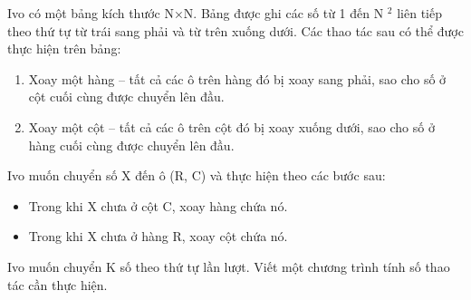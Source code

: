 Ivo có một bảng kích thước N×N. Bảng được ghi các số từ 1 đến N $^ 2 $ liên tiếp theo thứ tự từ trái sang phải và từ trên xuống dưới. Các thao tác sau có thể được thực hiện trên bảng:
\begin{enumerate}
	\item Xoay một hàng – tất cả các ô trên hàng đó bị xoay sang phải, sao cho số ở cột cuối cùng được chuyển lên đầu.
	\item Xoay một cột – tất cả các ô trên cột đó bị xoay xuống dưới, sao cho số ở hàng cuối cùng được chuyển lên đầu.
\end{enumerate}

Ivo muốn chuyển số X đến ô (R, C) và thực hiện theo các bước sau:
\begin{itemize}
	\item Trong khi X chưa ở cột C, xoay hàng chứa nó.
	\item Trong khi X chưa ở hàng R, xoay cột chứa nó.
\end{itemize}

Ivo muốn chuyển K số theo thứ tự lần lượt. Viết một chương trình tính số thao tác cần thực hiện.